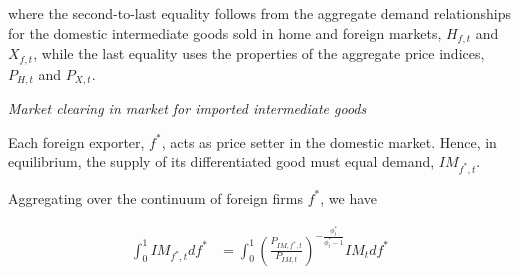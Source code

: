 \documentclass[a4paper,11pt]{article}
\numberwithin{equation}{section}
\begin{document}
	where the second-to-last equality follows from the aggregate demand relationships for the domestic intermediate goods sold in home and foreign markets, $H_{f,t}$ and $X_{f,t}$, while the last equality uses the properties of the aggregate price indices, $P_{H,t}$ and $P_{X,t}$.
	
%	
%	
%	
	
	\vspace{8pt}
	\textit{Market clearing in market for imported intermediate goods}
	\vspace{8pt}
	
	Each foreign exporter, $f^*$, acts as price setter in the domestic market. Hence, in equilibrium, the supply of its differentiated good must equal demand, $IM_{f^*,t}$.
	
	Aggregating over the continuum of foreign firms $f^*$, we have
	
	\begin{equation}
	\begin{split}
	\int_{0}^{1}IM_{f^*,t}df^* &= \int_{0}^{1}\left(\frac{P_{IM,f^*,t}}{P_{IM,t}}\right)^{-\frac{\phi_t^*}{\phi_t^*-1}}IM_tdf^* \\
	\end{split}
	\end{equation}
	
%	
%	
	
%	
	
\end{document}
